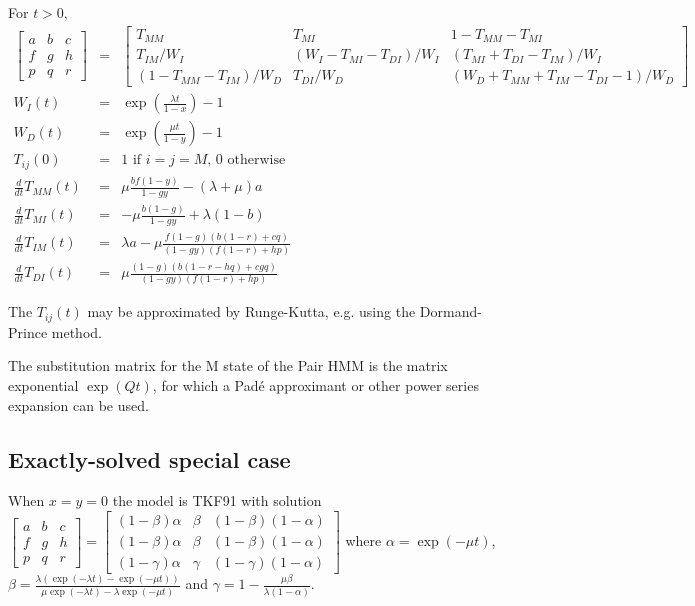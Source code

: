 \documentclass{article}
\begin{document}
For $t>0$, %
\begin{eqnarray*}
\begin{bmatrix}
a & b & c \\
f & g & h \\
p & q & r 
\end{bmatrix}
& = &
\begin{bmatrix}
T_{MM} & T_{MI} & 1-T_{MM}-T_{MI} \\
T_{IM}/W_I & (W_I-T_{MI}-T_{DI})/W_I & (T_{MI}+T_{DI}-T_{IM})/W_I \\
(1-T_{MM}-T_{IM})/W_D & T_{DI}/W_D & (W_D+T_{MM}+T_{IM}-T_{DI}-1)/W_D 
\end{bmatrix}
\\
W_I(t) & = & \exp\left(\frac{\lambda t}{1-x}\right)-1 \\
W_D(t) & = & \exp\left(\frac{\mu t}{1-y}\right)-1 \\
T_{ij}(0) & = & \mbox{1 if $i=j=M$, 0 otherwise}
\\
  \frac{d}{dt} T_{MM}(t) & = &
  \mu \frac{b f (1-y)}{1 - g y}-(\lambda +\mu )a
  \nonumber \\
  \frac{d}{dt} T_{MI}(t) & = &
  -\mu \frac{b (1-g)}{1 - g y} + \lambda (1-b)
  \nonumber \\
  \frac{d}{dt} T_{IM}(t) & = &
  \lambda a - \mu \frac{f (1-g) (b (1-r)+c q)}{(1 - g y) (f (1-r)+h p)}
  \nonumber \\
  \frac{d}{dt} T_{DI}(t) & = &
  \mu \frac{(1-g) (b (1-r-h q)+c g q)}{(1-g y) (f (1-r)+h p)}
\end{eqnarray*}

The $T_{ij}(t)$ may be approximated by Runge-Kutta,
e.g. using the Dormand-Prince method.

The substitution matrix for the M state of the Pair HMM is
the matrix exponential $\exp(Qt)$, for which a Pad\'{e} approximant
or other power series expansion can be used.

\subsection{Exactly-solved special case}

When $x=y=0$ the model is TKF91 \cite{ThorneEtAl91}
with solution
$
\begin{bmatrix}
a & b & c \\
f & g & h \\
p & q & r 
\end{bmatrix}
=
\begin{bmatrix}
(1-\beta)\alpha & \beta & (1-\beta)(1-\alpha) \\
(1-\beta)\alpha & \beta & (1-\beta)(1-\alpha) \\
(1-\gamma)\alpha & \gamma & (1-\gamma)(1-\alpha)
\end{bmatrix}
$
where
$\alpha = \exp(-\mu t)$,
$\beta = \frac{\lambda \left( \exp(-\lambda t) - \exp(-\mu t) \right)}{\mu \exp(-\lambda t) - \lambda \exp(-\mu t)}$
and
$\gamma = 1 - \frac{\mu \beta}{\lambda (1 - \alpha)}$.
\end{document}
